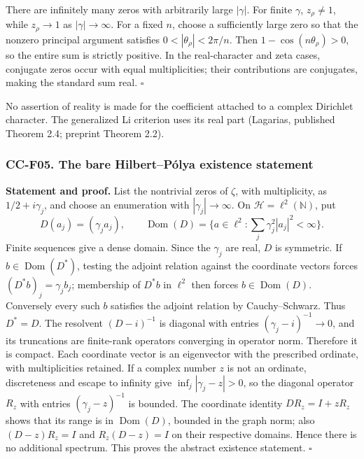 \documentclass[11pt,a4paper]{article}
\theoremstyle{definition}\newtheorem{definition}[theorem]{Definition}
\theoremstyle{remark}\newtheorem{remark}[theorem]{Remark}
\begin{document}
There are infinitely many zeros with arbitrarily large \(|\gamma|\). For
finite \(\gamma\), \(z_\rho\ne1\), while \(z_\rho\to1\) as
\(|\gamma|\to\infty\). For a fixed \(n\), choose a sufficiently large
zero so that the nonzero principal argument satisfies
\(0<|\theta_\rho|<2\pi/n\). Then \(1-\cos(n\theta_\rho)>0\), so the
entire sum is strictly positive. In the real-character and zeta cases,
conjugate zeros occur with equal multiplicities; their contributions are
conjugates, making the standard sum real. \(\square\)

No assertion of reality is made for the coefficient attached to a
complex Dirichlet character. The generalized Li criterion uses its real
part (Lagarias, published Theorem 2.4; preprint Theorem 2.2).

\subsubsection{CC-F05. The bare Hilbert--Pólya existence
statement}\label{cc-f05.-the-bare-hilbertpuxf3lya-existence-statement}

\textbf{Statement and proof.} List the nontrivial zeros of \(\zeta\),
with multiplicity, as \(1/2+i\gamma_j\), and choose an enumeration with
\(|\gamma_j|\to\infty\). On \(\mathcal H=\ell^2(\mathbb N)\), put \[
 D(a_j)=(\gamma_j a_j),\qquad
 \operatorname{Dom}(D)=\{a\in\ell^2:\sum_j\gamma_j^2|a_j|^2<\infty\}.
\] Finite sequences give a dense domain. Since the \(\gamma_j\) are
real, \(D\) is symmetric. If \(b\in\operatorname{Dom}(D^*)\), testing
the adjoint relation against the coordinate vectors forces
\((D^*b)_j=\gamma_jb_j\); membership of \(D^*b\) in \(\ell^2\) then
forces \(b\in\operatorname{Dom}(D)\). Conversely every such \(b\)
satisfies the adjoint relation by Cauchy--Schwarz. Thus \(D^*=D\). The
resolvent \((D-i)^{-1}\) is diagonal with entries
\((\gamma_j-i)^{-1}\to0\), and its truncations are finite-rank operators
converging in operator norm. Therefore it is compact. Each coordinate
vector is an eigenvector with the prescribed ordinate, with
multiplicities retained. If a complex number \(z\) is not an ordinate,
discreteness and escape to infinity give \(\inf_j|\gamma_j-z|>0\), so
the diagonal operator \(R_z\) with entries \((\gamma_j-z)^{-1}\) is
bounded. The coordinate identity \(DR_z=I+zR_z\) shows that its range is
in \(\operatorname{Dom}(D)\), bounded in the graph norm; also
\((D-z)R_z=I\) and \(R_z(D-z)=I\) on their respective domains. Hence
there is no additional spectrum. This proves the abstract existence
statement. \(\square\)
\end{document}

